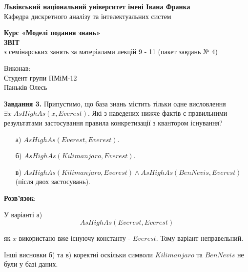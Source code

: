 \documentclass[a4paper,14pt]{extarticle} %
\begin{document}
\thispagestyle{empty}

\begin{center}
    \textbf{Львівський національний університет імені Івана Франка}\\[1ex]
    Кафедра дискретного аналізу та інтелектуальних систем
\end{center}

\vspace{5cm} %

\begin{center}
    \Large\textbf{Курс «Моделі подання знань»}\\[4ex]
    \huge\textbf{ЗВІТ}\\[3ex]
    \Large з семінарських занять за матеріалами лекцій 9 - 11 (пакет завдань № 4)
\end{center}

\vspace{2cm}
\begin{flushright}
    Виконав:\\
    Студент групи ПМіМ-12\\
    Паньків Олесь
\end{flushright}


\newpage
\pagestyle{plain}

\textbf{Завдання 3.} Припустимо, що база знань містить тільки одне висловлення
$\exists x\; AsHighAs(x, Everest)$. Які з наведених нижче фактів є правильними
результатами застосування правила конкретизації з квантором існування?

\begin{itemize}
    \item[а)] $AsHighAs(Everest, Everest).$
    \item[б)] $AsHighAs(Kilimanjaro, Everest).$
    \item[в)] $AsHighAs(Kilimanjaro, Everest) \land AsHighAs(BenNevis, Everest)$ \\
    \hspace*{1.8em}(після двох застосувань).
\end{itemize}

\textbf{Розв'язок}:

У варіанті а)
\[
    AsHighAs(Everest,Everest)
\]

як $x$ використано вже існуючу константу - $Everest$. Тому варіант
неправельний.

Інші висновки б) та в) коректні оскільки символи $Kilimanjaro$ та $BenNevis$ не
були у базі даних.
\end{document}

